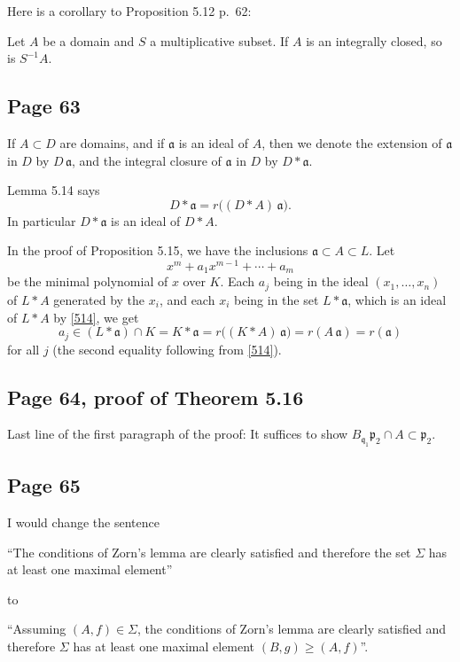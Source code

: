 \documentclass[parskip=half,fontsize=12pt]{scrartcl}%
\newcommand{\mf}{\mathfrak}
\newcommand{\aaa}{\mf a}
\newcommand{\ppp}{\mf p}
\newcommand{\qqq}{\mf q}
\begin{document}
Here is a corollary to Proposition 5.12 p.~62:

Let $A$ be a domain and $S$ a multiplicative subset. If $A$ is an integrally closed, so is $S^{-1}A$.

\subsection{Page 63}%

If $A\subset D$ are domains, and if $\aaa$ is an ideal of $A$, then we denote the extension of $\aaa$ in $D$ by $D\,\aaa$, and the integral closure of $\aaa$ in $D$ by $D*\aaa$. 

Lemma 5.14 says
\begin{equation}\label{514}
D*\aaa=r\Big((D*A)\,\aaa\Big).
\end{equation}
In particular $D*\aaa$ is an ideal of $D*A$. 

In the proof of Proposition 5.15, we have the inclusions $\aaa\subset A\subset L$. Let 
$$
x^m+a_1x^{m-1}+\cdots+a_m
$$ 
be the minimal polynomial of $x$ over $K$. Each $a_j$ being in the ideal $(x_1,\dots,x_n)$ of $L*A$ generated by the $x_i$, and each $x_i$ being in the set $L*\aaa$, which is an ideal of $L*A$ by \eqref{514}, we get 
$$
a_j\in(L*\aaa)\cap K=K*\aaa=r\Big((K*A)\,\aaa\Big)=r(A\,\aaa)=r(\aaa)
$$ 
for all $j$ (the second equality following from \eqref{514}).

\subsection{Page 64, proof of Theorem 5.16}%

Last line of the first paragraph of the proof: It suffices to show $B_{\qqq_1}\ppp_2\cap A\subset\ppp_2$.

\subsection{Page 65}\label{65}%

I would change the sentence

``The conditions of Zorn's lemma are clearly satisfied and therefore the set $\Sigma$ has at least one maximal element''

to 

``Assuming $(A,f)\in\Sigma$, the conditions of Zorn's lemma are clearly satisfied and therefore $\Sigma$ has at least one maximal element $(B,g)\ge(A,f)$''. %
\end{document}
